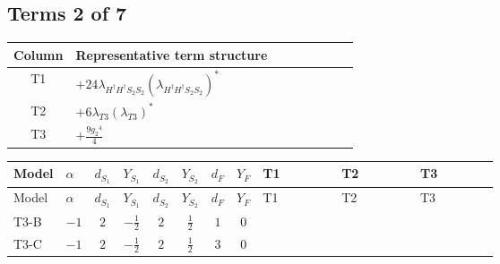 \documentclass[8pt]{article}
\begin{document}
\begin{landscape}
\subsection*{Terms 2 of 7}
\begin{center}
\begin{tabular}{@{}c >{\raggedright\arraybackslash}p{0.82\linewidth}@{}}
\toprule
Column & Representative term structure \\
\midrule
T1 & \(\displaystyle +24 {\lambda_{H^\dagger H^\dagger S_2 S_2}} \left({\lambda_{H^\dagger H^\dagger S_2 S_2}}\right)^{*}\) \\
\midrule
T2 & \(\displaystyle +6 {\lambda_{T3}} \left({\lambda_{T3}}\right)^{*}\) \\
\midrule
T3 & \(\displaystyle +\frac{9 {g_2}^4}{4}\) \\
\midrule
\bottomrule
\end{tabular}
\end{center}
\smallskip
\tiny
\begin{longtable}{@{}llcccccc >{\raggedright\arraybackslash}p{0.21\linewidth} >{\raggedright\arraybackslash}p{0.21\linewidth} >{\raggedright\arraybackslash}p{0.21\linewidth}@{}}
\toprule
Model & $\alpha$ & $d_{S_1}$ & $Y_{S_1}$ & $d_{S_2}$ & $Y_{S_2}$ & $d_F$ & $Y_F$ & T1 & T2 & T3 \\
\midrule
\endfirsthead
\toprule
Model & $\alpha$ & $d_{S_1}$ & $Y_{S_1}$ & $d_{S_2}$ & $Y_{S_2}$ & $d_F$ & $Y_F$ & T1 & T2 & T3 \\
\midrule
\endhead
T3-B & $-1$ & $2$ & $-\frac{1}{2}$ & $2$ & $\frac{1}{2}$ & $1$ & $0$ & \scriptsize\adjustbox{max width=\linewidth}{$\begin{gathered} +24 {\lambda_{H^\dagger H^\dagger S_2 S_2}} \left({\lambda_{H^\dagger H^\dagger S_2 S_2}}\right)^{*}\end{gathered}$} & \scriptsize\adjustbox{max width=\linewidth}{$\begin{gathered} +6 {\lambda_{T3}} \left({\lambda_{T3}}\right)^{*}\end{gathered}$} & \scriptsize\adjustbox{max width=\linewidth}{$\begin{gathered} +\frac{9 {g_2}^4}{4}\end{gathered}$} \\
\midrule
T3-C & $-1$ & $2$ & $-\frac{1}{2}$ & $2$ & $\frac{1}{2}$ & $3$ & $0$ & \scriptsize\adjustbox{max width=\linewidth}{$\begin{gathered} +24 {\lambda_{H^\dagger H^\dagger S_2 S_2}} \left({\lambda_{H^\dagger H^\dagger S_2 S_2}}\right)^{*}\end{gathered}$} & \scriptsize\adjustbox{max width=\linewidth}{$\begin{gathered} +6 {\lambda_{T3}} \left({\lambda_{T3}}\right)^{*}\end{gathered}$} & \scriptsize\adjustbox{max width=\linewidth}{$\begin{gathered} +\frac{9 {g_2}^4}{4}\end{gathered}$} \\

\end{longtable}
\end{landscape}
\end{document}
